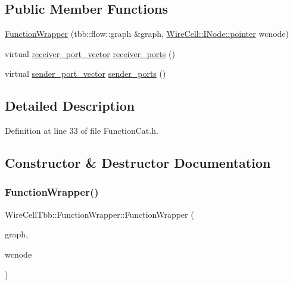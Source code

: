 \subsection*{Public Member Functions}
\begin{DoxyCompactItemize}
\item 
\hyperlink{class_wire_cell_tbb_1_1_function_wrapper_a9d4f4231681df1c1b34d34b3a5002427}{Function\+Wrapper} (tbb\+::flow\+::graph \&graph, \hyperlink{class_wire_cell_1_1_interface_a09c548fb8266cfa39afb2e74a4615c37}{Wire\+Cell\+::\+I\+Node\+::pointer} wcnode)
\item 
virtual \hyperlink{namespace_wire_cell_tbb_a87f42fe8a3ccc3bf9d315cb2d252c7af}{receiver\+\_\+port\+\_\+vector} \hyperlink{class_wire_cell_tbb_1_1_function_wrapper_a7d856ca70ebeb8947ce18c1a711f60ac}{receiver\+\_\+ports} ()
\item 
virtual \hyperlink{namespace_wire_cell_tbb_a99272fef0f0c33dc9d4e6e8f777b2e6e}{sender\+\_\+port\+\_\+vector} \hyperlink{class_wire_cell_tbb_1_1_function_wrapper_a8b573eef2825b3f7920f7f358ddf914c}{sender\+\_\+ports} ()
\end{DoxyCompactItemize}


\subsection{Detailed Description}


Definition at line 33 of file Function\+Cat.\+h.



\subsection{Constructor \& Destructor Documentation}
\mbox{\label{class_wire_cell_tbb_1_1_function_wrapper_a9d4f4231681df1c1b34d34b3a5002427}} 
\subsubsection{\texorpdfstring{Function\+Wrapper()}{FunctionWrapper()}}
{\footnotesize\ttfamily Wire\+Cell\+Tbb\+::\+Function\+Wrapper\+::\+Function\+Wrapper (\begin{DoxyParamCaption}\item[{tbb\+::flow\+::graph \&}]{graph,  }\item[{\hyperlink{class_wire_cell_1_1_interface_a09c548fb8266cfa39afb2e74a4615c37}{Wire\+Cell\+::\+I\+Node\+::pointer}}]{wcnode }\end{DoxyParamCaption})\hspace{0.3cm}{\ttfamily [inline]}}



